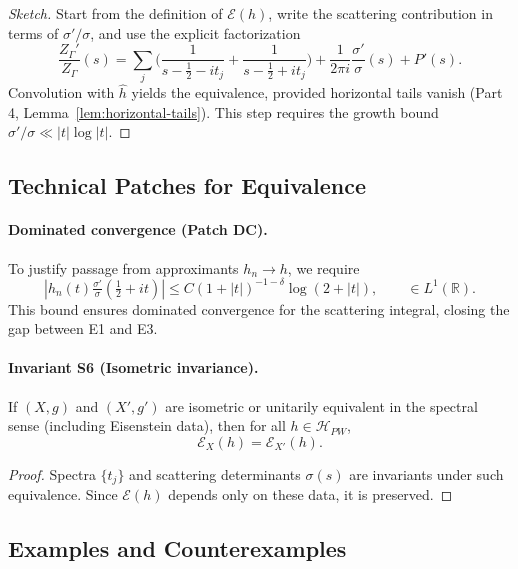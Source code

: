 \begin{proof}[Sketch]
Start from the definition of $\mathcal{E}(h)$, write the scattering contribution in terms of $\sigma'/\sigma$, and use the explicit factorization
\[
\frac{Z_\Gamma'}{Z_\Gamma}(s) = \sum_j \Big(\frac{1}{s-\tfrac{1}{2}-it_j}+\frac{1}{s-\tfrac{1}{2}+it_j}\Big) + \frac{1}{2\pi i}\frac{\sigma'}{\sigma}(s) + P'(s).
\]
Convolution with $\widehat{h}$ yields the equivalence, provided horizontal tails vanish (Part 4, Lemma~\ref{lem:horizontal-tails}). This step requires the growth bound $\sigma'/\sigma \ll |t|\log|t|$.
\end{proof}

\subsection{Technical Patches for Equivalence}

\paragraph{Dominated convergence (Patch DC).}  
To justify passage from approximants $h_n \to h$, we require
\[
|h_n(t)\tfrac{\sigma'}{\sigma}(\tfrac{1}{2}+it)| \leq C(1+|t|)^{-1-\delta}\log(2+|t|), \qquad \in L^1(\mathbb{R}).
\]
This bound ensures dominated convergence for the scattering integral, closing the gap between E1 and E3.

\paragraph{Invariant S6 (Isometric invariance).}

\begin{proposition}
\label{prop:isometry-invariance}
If $(X,g)$ and $(X',g')$ are isometric or unitarily equivalent in the spectral sense (including Eisenstein data), then for all $h \in \mathcal{H}_{PW}$,
\[
\mathcal{E}_X(h) = \mathcal{E}_{X'}(h).
\]
\end{proposition}

\begin{proof}
Spectra $\{t_j\}$ and scattering determinants $\sigma(s)$ are invariants under such equivalence. Since $\mathcal{E}(h)$ depends only on these data, it is preserved.
\end{proof}

\subsection{Examples and Counterexamples}

